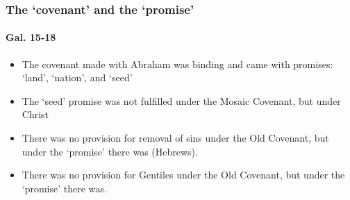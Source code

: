 \begin{frame}
\frametitle{The `covenant' and the `promise'}
\framesubtitle{Gal. 15-18}
\begin{itemize}
	\item The covenant made with Abraham was binding and came with promises: `land', `nation', and `seed'
	\item The `seed' promise was not fulfilled under the Mosaic Covenant, but under Christ
	\item There was no provision for removal of sins under the Old Covenant, but under the `promise' there was (Hebrews).
	\item There was no provision for Gentiles under the Old Covenant, but under the `promise' there was.
\end{itemize}

\end{frame}

